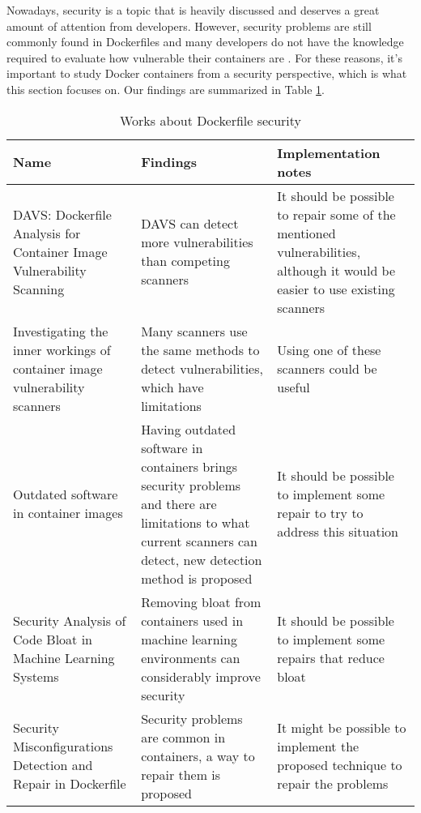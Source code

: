 Nowadays, security is a topic that is heavily discussed and deserves a great amount of attention from developers. However, security problems are still commonly found in Dockerfiles \cite{doanDAVSDockerfileAnalysis2022} and many developers do not have the knowledge required to evaluate how vulnerable their containers are \cite{zareiInvestigatingInnerWorkings2022}. For these reasons, it's important to study Docker containers from a security perspective, which is what this section focuses on. Our findings are summarized in Table \ref{tab:works_dockerfile_security}.

\begin{table}[H]
    \centering
    \begin{tabular}{|p{}|p{}|p{}|}
        \hline \textbf{Name} & \textbf{Findings} & \textbf{Implementation notes} \\
        \hline DAVS: Dockerfile Analysis for Container Image Vulnerability Scanning \cite{doanDAVSDockerfileAnalysis2022} & DAVS can detect more vulnerabilities than competing scanners & It should be possible to repair some of the mentioned vulnerabilities, although it would be easier to use existing scanners \\
        \hline Investigating the inner workings of container image vulnerability scanners \cite{zareiInvestigatingInnerWorkings2022} & Many scanners use the same methods to detect vulnerabilities, which have limitations & Using one of these scanners could be useful \\
        \hline Outdated software in container images \cite{linnalampiOutdatedSoftwareContainer2021} & Having outdated software in containers brings security problems and there are limitations to what current scanners can detect, new detection method is proposed & It should be possible to implement some repair to try to address this situation \\
        \hline Security Analysis of Code Bloat in Machine Learning Systems \cite{ahmedSecurityAnalysisCode2022} & Removing bloat from containers used in machine learning environments can considerably improve security & It should be possible to implement some repairs that reduce bloat \\
        \hline Security Misconfigurations Detection and Repair in Dockerfile \cite{prinettoSecurityMisconfigurationsDetection} & Security problems are common in containers, a way to repair them is proposed & It might be possible to implement the proposed technique to repair the problems \\
        \hline
    \end{tabular}
    \caption{Works about Dockerfile security}
    \label{tab:works_dockerfile_security}
\end{table}

